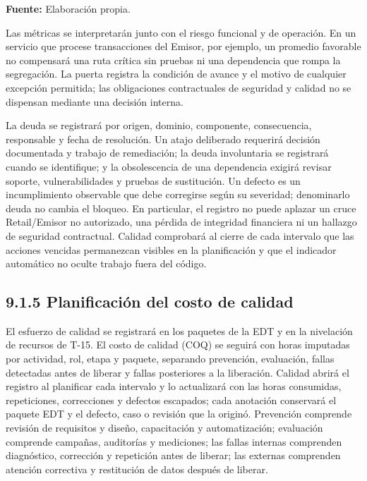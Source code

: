\documentclass[11pt]{article}
\begin{document}
\textbf{Fuente:} Elaboración propia.

Las métricas se interpretarán junto con el riesgo funcional y de operación. En un servicio que procese transacciones del Emisor, por ejemplo, un promedio favorable no compensará una ruta crítica sin pruebas ni una dependencia que rompa la segregación. La puerta registra la condición de avance y el motivo de cualquier excepción permitida; las obligaciones contractuales de seguridad y calidad no se dispensan mediante una decisión interna.

La deuda se registrará por origen, dominio, componente, consecuencia, responsable y fecha de resolución. Un atajo deliberado requerirá decisión documentada y trabajo de remediación; la deuda involuntaria se registrará cuando se identifique; y la obsolescencia de una dependencia exigirá revisar soporte, vulnerabilidades y pruebas de sustitución. Un defecto es un incumplimiento observable que debe corregirse según su severidad; denominarlo deuda no cambia el bloqueo. En particular, el registro no puede aplazar un cruce Retail/Emisor no autorizado, una pérdida de integridad financiera ni un hallazgo de seguridad contractual. Calidad comprobará al cierre de cada intervalo que las acciones vencidas permanezcan visibles en la planificación y que el indicador automático no oculte trabajo fuera del código.

\subsection{9.1.5 Planificación del costo de calidad}

El esfuerzo de calidad se registrará en los paquetes de la EDT y en la nivelación de recursos de T-15. El costo de calidad (COQ) se seguirá con horas imputadas por actividad, rol, etapa y paquete, separando prevención, evaluación, fallas detectadas antes de liberar y fallas posteriores a la liberación. Calidad abrirá el registro al planificar cada intervalo y lo actualizará con las horas consumidas, repeticiones, correcciones y defectos escapados; cada anotación conservará el paquete EDT y el defecto, caso o revisión que la originó. Prevención comprende revisión de requisitos y diseño, capacitación y automatización; evaluación comprende campañas, auditorías y mediciones; las fallas internas comprenden diagnóstico, corrección y repetición antes de liberar; las externas comprenden atención correctiva y restitución de datos después de liberar.
\end{document}
